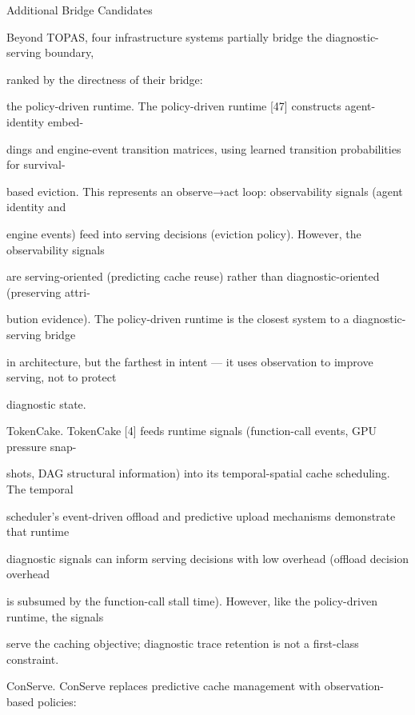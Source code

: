 \begin{flushleft}
\par\smallskip
{} Additional Bridge Candidates\par
\noindent Beyond TOPAS, four infrastructure systems partially bridge the diagnostic-serving boundary,\par
\noindent ranked by the directness of their bridge:\par
\par\smallskip
\noindent the policy-driven runtime. The policy-driven runtime [47] constructs agent-identity embed-\par
\noindent dings and engine-event transition matrices, using learned transition probabilities for survival-\par
\noindent based eviction. This represents an observe→act loop: observability signals (agent identity and\par
\noindent engine events) feed into serving decisions (eviction policy). However, the observability signals\par
\noindent are serving-oriented (predicting cache reuse) rather than diagnostic-oriented (preserving attri-\par
\noindent bution evidence). The policy-driven runtime is the closest system to a diagnostic-serving bridge\par
\noindent in architecture, but the farthest in intent — it uses observation to improve serving, not to protect\par
\noindent diagnostic state.\par
\par\smallskip
\noindent TokenCake. TokenCake [4] feeds runtime signals (function-call events, GPU pressure snap-\par
\noindent shots, DAG structural information) into its temporal-spatial cache scheduling. The temporal\par
\noindent scheduler’s event-driven offload and predictive upload mechanisms demonstrate that runtime\par
\noindent diagnostic signals can inform serving decisions with low overhead (offload decision overhead\par
\noindent is subsumed by the function-call stall time). However, like the policy-driven runtime, the signals\par
\noindent serve the caching objective; diagnostic trace retention is not a first-class constraint.\par
\par\smallskip
\noindent ConServe. ConServe replaces predictive cache management with observation-based policies:\par

\end{flushleft}
